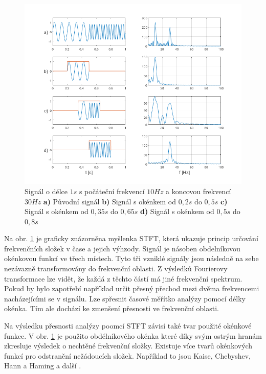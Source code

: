   \begin{figure}[H]
    \centering
    \includegraphics[width = 1\linewidth]{obrazky/STFT.png}
    \caption{Signál o délce $1 s$ s počáteční frekvencí $10 Hz$ a koncovou frekvencí $30 Hz$ \textbf{a)} Původní signál \textbf{b)} Signál s okénkem od $0,2 s$ do $0,5 s$ \textbf{c)} Signál s okénkem od $0,35 s$ do $0,65 s$ \textbf{d)} Signál s okénkem od $0,5 s$ do $0,8 s$ \cite{fundamental_of_music_processing}}
    \label{fig:STFT}
  \end{figure}

  Na obr. \ref*{fig:STFT} je graficky znázorněna myšlenka \acs{STFT}, která ukazuje princip určování frekvenčních složek v čase a jejich výhzody. 
  Signál je násoben obdelníkovou okénkovou funkcí ve třech místech.
  Tyto tři vzniklé signály jsou následně na sebe nezávazně transformovány do frekvenční oblasti.
  Z výsledků Fourierovy transformace lze vidět, že každá z těchto částí má jiné frekvenční spektrum.
  Pokud by bylo zapotřebí například určit přesný přechod mezi dvěma frekvencemi nacházejícími se v signálu. Lze spřesnit časové měřítko analýzy pomocí délky okénka.
  Tím ale dochází ke zmenšení přesnosti ve frekvenční oblasti.
  
  Na výsledku přesnosti analýzy poomcí \acs{STFT} závisí také tvar použité okénkové funkce.
  V obr. \ref*{fig:STFT} je použito obdélníkového okénka které díky svým ostrým hranám zkresluje výsledek o nechtěné frekvenční složky.
  Existuje více tvarů okénkových funkcí pro odstranění nežádoucích složek.
  Například to jsou Kaise, Chebyshev, Hann a Haming a další \cite{Time-frequency_distributions}.

